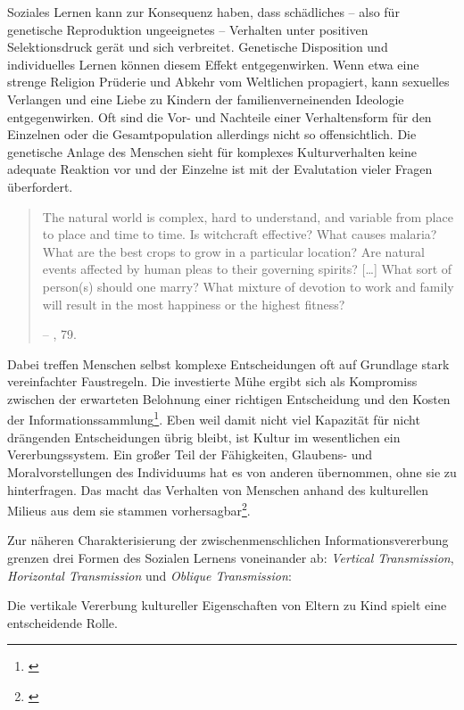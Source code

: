 \documentclass[openany,twoside,twocolumn]{book}
\let\rmarkdownfootnote\footnote%
\def\footnote{\protect\rmarkdownfootnote}
\begin{document}
Soziales Lernen kann zur Konsequenz haben, dass schädliches -- also für
genetische Reproduktion ungeeignetes -- Verhalten unter positiven
Selektionsdruck gerät und sich verbreitet. Genetische Disposition und
individuelles Lernen können diesem Effekt entgegenwirken. Wenn etwa eine
strenge Religion Prüderie und Abkehr vom Weltlichen propagiert, kann
sexuelles Verlangen und eine Liebe zu Kindern der familienverneinenden
Ideologie entgegenwirken. Oft sind die Vor- und Nachteile einer
Verhaltensform für den Einzelnen oder die Gesamtpopulation allerdings
nicht so offensichtlich. Die genetische Anlage des Menschen sieht für
komplexes Kulturverhalten keine adequate Reaktion vor und der Einzelne
ist mit der Evalutation vieler Fragen überfordert.

\begin{quote}
The natural world is complex, hard to understand, and variable from
place to place and time to time. Is witchcraft effective? What causes
malaria? What are the best crops to grow in a particular location? Are
natural events affected by human pleas to their governing spirits?
{[}\ldots{}{]} What sort of person(s) should one marry? What mixture of
devotion to work and family will result in the most happiness or the
highest fitness?

-- \textcite{smith_cultural_1992}, 79.
\end{quote}

Dabei treffen Menschen selbst komplexe Entscheidungen oft auf Grundlage
stark vereinfachter Faustregeln. Die investierte Mühe ergibt sich als
Kompromiss zwischen der erwarteten Belohnung einer richtigen
Entscheidung und den Kosten der Informationssammlung\footnote{\textcite{nisbett_human_1980}}.
Eben weil damit nicht viel Kapazität für nicht drängenden Entscheidungen
übrig bleibt, ist Kultur im wesentlichen ein Vererbungssystem. Ein
großer Teil der Fähigkeiten, Glaubens- und Moralvorstellungen des
Individuums hat es von anderen übernommen, ohne sie zu hinterfragen. Das
macht das Verhalten von Menschen anhand des kulturellen Milieus aus dem
sie stammen vorhersagbar\footnote{\textcite{smith_cultural_1992}}.

Zur näheren Charakterisierung der zwischenmenschlichen
Informationsvererbung grenzen \autocite{cavalli-sforza_cultural_1981}
drei Formen des Sozialen Lernens voneinander ab: \emph{Vertical
Transmission}, \emph{Horizontal Transmission} und \emph{Oblique
Transmission}:

Die vertikale Vererbung kultureller Eigenschaften von Eltern zu Kind
spielt eine entscheidende Rolle.
\end{document}
